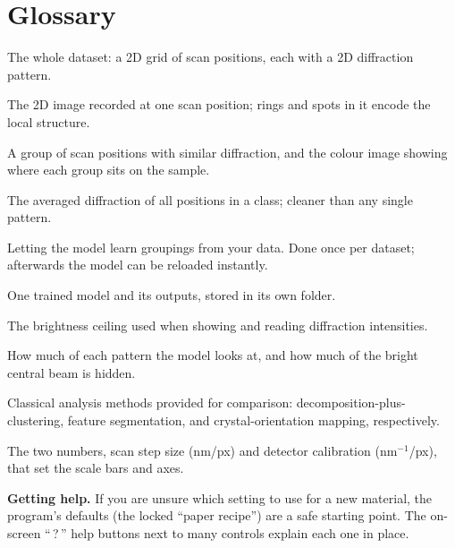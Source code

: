 \documentclass[11pt]{article}
\begin{document}
\section{Glossary}
\begin{description}[style=nextline,leftmargin=1.4em,itemsep=3pt]
\item[4D-STEM cube] The whole dataset: a 2D grid of scan positions, each with a 2D
diffraction pattern.
\item[Diffraction pattern] The 2D image recorded at one scan position; rings and
spots in it encode the local structure.
\item[Class / class map] A group of scan positions with similar diffraction, and
the colour image showing where each group sits on the sample.
\item[Class average] The averaged diffraction of all positions in a class; cleaner
than any single pattern.
\item[Training] Letting the model learn groupings from your data. Done once per
dataset; afterwards the model can be reloaded instantly.
\item[Run] One trained model and its outputs, stored in its own folder.
\item[vmax] The brightness ceiling used when showing and reading diffraction
intensities.
\item[Crop / mask] How much of each pattern the model looks at, and how much of the
bright central beam is hidden.
\item[NMF, SAM, ACOM] Classical analysis methods provided for comparison:
decomposition-plus-clustering, feature segmentation, and crystal-orientation
mapping, respectively.
\item[Calibration (real / reciprocal)] The two numbers, scan step size (nm/px) and
detector calibration (nm$^{-1}$/px), that set the scale bars and axes.
\end{description}

\vfill
\noindent\colorbox{soft}{\parbox{\dimexpr\linewidth-2\fboxsep}{\small
\textbf{Getting help.} If you are unsure which setting to use for a new material,
the program's defaults (the locked ``paper recipe'') are a safe starting point. The
on-screen ``\,?\,'' help buttons next to many controls explain each one in place.}}
\end{document}
